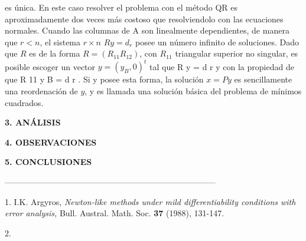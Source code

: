 \documentclass[twocolumn,twoside]{article}
\begin{document}
es única. En este caso resolver el problema con el método QR es aproximadamente
dos veces más costoso que resolviendolo con las ecuaciones normales. Cuando las columnas
 de A son linealmente dependientes, de manera que $r < n$, el sistema $r\times n$ $Ry = d_r$
posee un número infinito de soluciones. Dado que $R$ es de la forma $R = (R_{11} R_{12} )$, con
$R_{11}$ triangular superior no singular, es posible escoger un vector $y = (y_B , 0)^t$ tal que
R y = d r y con la propiedad de que R 11 y B = d r . Si y posee esta forma, la solución
$x = Py$ es sencillamente una reordenación de $y$, y es llamada una solución básica del
problema de m\'inimos cuadrados.
\begin{center}
{\large \bf 3. AN\'ALISIS}
\end{center}

\begin{center}
{\large \bf 4. OBSERVACIONES}
\end{center}

\begin{center}
{\large \bf 5. CONCLUSIONES}
\end{center}




\begin{center}
 -----------------------------------------------------------------------------
\end{center}

\begin{list}{}{\setlength{\topsep}{0mm}\setlength{\itemsep}{0mm}%
\setlength{\parsep}{0mm}\setlength{\leftmargin}{4mm}}
%
\small
\item[1.] I.K. Argyros, \textit{Newton-like methods under mild \linebreak differentiability conditions with error analysis,} Bull. \linebreak Austral. Math. Soc. \textbf{37} (1988), 131-147.
\item[2.] 
%
\end{list}
\end{document}
